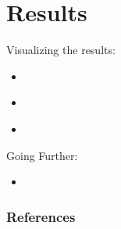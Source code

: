 \documentclass[aspectratio=169]{beamer}
\begin{document}
  \section{Results} %
  \label{sec:results}
    \begin{frame}
      Visualizing the results:
      \begin{itemize}
        \item{
          \href{run:videos/sxs-vortex-tendex_visualization-head-on_collision.mp4}{}
          \href{https://www.youtube.com/watch?v=4nM6kf2OAFw}{}
        }
        \item{
          \href{run:videos/sxs-demo_binary_orbit_and_collision.mp4}{}
          \href{https://www.youtube.com/watch?v=p647WrQd684}{}
        }
        \item{
          \href{run:videos/sxs-highly-precessing_bbh_run.mp4}{}
          \href{https://www.youtube.com/watch?v=grA5KfDlsAY}{}
        }
      \end{itemize}
      \bigskip

      Going Further:
      \begin{itemize}
        \item{
          \href{run:videos/nasa-colliding_neutron_stars_create_black_hole_and_gamma-ray_burst.webm}{}
          \href{https://www.youtube.com/watch?v=ow9JCXy1QdY&t=2s}{}
        }
      \end{itemize}
    \end{frame}

  \begin{frame}
    \frametitle{References}
    \scriptsize
    \begin{multicols}{2}
      \nocite{*}
      
    \end{multicols}
  \end{frame}
\end{document}
